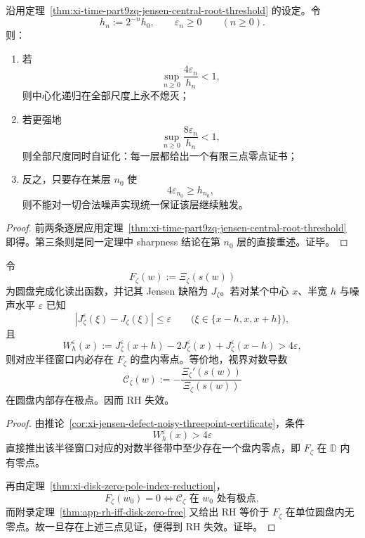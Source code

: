 \begin{corollary}\label{cor:xi-time-part9zq-jensen-dyadic-critical-noise}
沿用定理~\ref{thm:xi-time-part9zq-jensen-central-root-threshold} 的设定。令
\[
h_n:=2^{-n}h_0,
\qquad
\varepsilon_n\ge 0
\qquad(n\ge 0).
\]
则：
\begin{enumerate}
  \item 若
  \[
  \sup_{n\ge 0}\frac{4\varepsilon_n}{h_n}<1,
  \]
  则中心化递归在全部尺度上永不熄灭；
  \item 若更强地
  \[
  \sup_{n\ge 0}\frac{8\varepsilon_n}{h_n}<1,
  \]
  则全部尺度同时自证化：每一层都给出一个有限三点零点证书；
  \item 反之，只要存在某层 \(n_0\) 使
  \[
  4\varepsilon_{n_0}\ge h_{n_0},
  \]
  则不能对一切合法噪声实现统一保证该层继续触发。
\end{enumerate}
\end{corollary}
\begin{proof}
前两条逐层应用定理~\ref{thm:xi-time-part9zq-jensen-central-root-threshold} 即得。第三条则是同一定理中 sharpness 结论在第 \(n_0\) 层的直接重述。证毕。
\end{proof}

\begin{theorem}\label{thm:xi-time-part9zq-threepoint-jensen-rh-disproof}
令
\[
F_\zeta(w):=\Xi_\zeta(s(w))
\]
为圆盘完成化读出函数，并记其 Jensen 缺陷为 \(J_\zeta\)。若对某个中心 \(x\)、半宽 \(h\) 与噪声水平 \(\varepsilon\) 已知
\[
\left|J_\zeta^\varepsilon(\xi)-J_\zeta(\xi)\right|\le \varepsilon
\qquad
\bigl(\xi\in\{x-h,x,x+h\}\bigr),
\]
且
\[
W_h^\varepsilon(x)
:=
J_\zeta^\varepsilon(x+h)-2J_\zeta^\varepsilon(x)+J_\zeta^\varepsilon(x-h)
>
4\varepsilon,
\]
则对应半径窗口内必存在 \(F_\zeta\) 的盘内零点。等价地，视界对数导数
\[
\mathscr C_\zeta(w):=-\frac{\Xi_\zeta'(s(w))}{\Xi_\zeta(s(w))}
\]
在圆盘内部存在极点。因而 RH 失效。
\end{theorem}
\begin{proof}
由推论~\ref{cor:xi-jensen-defect-noisy-threepoint-certificate}，条件
\[
W_h^\varepsilon(x)>4\varepsilon
\]
直接推出该半径窗口对应的对数半径带中至少存在一个盘内零点，即 \(F_\zeta\) 在 \(\mathbb D\) 内有零点。

再由定理~\ref{thm:xi-disk-zero-pole-index-reduction}，
\[
F_\zeta(w_0)=0
\iff
\mathscr C_\zeta \text{ 在 }w_0\text{ 处有极点},
\]
而附录定理~\ref{thm:app-rh-iff-disk-zero-free} 又给出 RH 等价于 \(F_\zeta\) 在单位圆盘内无零点。故一旦存在上述三点见证，便得到 RH 失效。证毕。
\end{proof}

